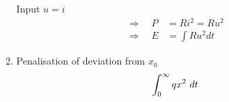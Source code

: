 \begin{itemize}
\begin{enumerate}
\begin{figure}[H]
            \end{figure}
            
            Input $u = i$
            \begin{align*}
            \Rightarrow    \quad P&= Ri^2 = Ru^2\\
            \Rightarrow \quad E&= \int Ru^2 dt
            \end{align*}
            
    \item Penalisation of deviation from $x_0$
            \begin{align*}
            \int_{0}^{\infty}  qx^2  ~dt
            \end{align*}
    \end{enumerate}
\end{itemize}
\cleardoublepage
